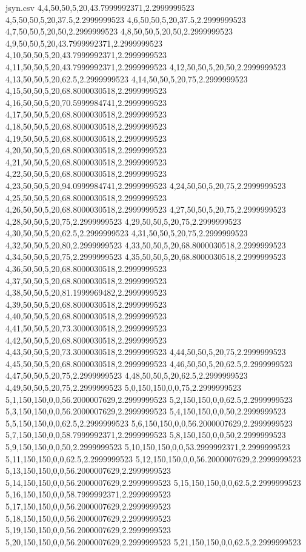 \begin{filecontents*}{jsyn.csv}
4,4,50,50,5,20,43.7999992371,2.2999999523
4,5,50,50,5,20,37.5,2.2999999523
4,6,50,50,5,20,37.5,2.2999999523
4,7,50,50,5,20,50,2.2999999523
4,8,50,50,5,20,50,2.2999999523
4,9,50,50,5,20,43.7999992371,2.2999999523
4,10,50,50,5,20,43.7999992371,2.2999999523
4,11,50,50,5,20,43.7999992371,2.2999999523
4,12,50,50,5,20,50,2.2999999523
4,13,50,50,5,20,62.5,2.2999999523
4,14,50,50,5,20,75,2.2999999523
4,15,50,50,5,20,68.8000030518,2.2999999523
4,16,50,50,5,20,70.5999984741,2.2999999523
4,17,50,50,5,20,68.8000030518,2.2999999523
4,18,50,50,5,20,68.8000030518,2.2999999523
4,19,50,50,5,20,68.8000030518,2.2999999523
4,20,50,50,5,20,68.8000030518,2.2999999523
4,21,50,50,5,20,68.8000030518,2.2999999523
4,22,50,50,5,20,68.8000030518,2.2999999523
4,23,50,50,5,20,94.0999984741,2.2999999523
4,24,50,50,5,20,75,2.2999999523
4,25,50,50,5,20,68.8000030518,2.2999999523
4,26,50,50,5,20,68.8000030518,2.2999999523
4,27,50,50,5,20,75,2.2999999523
4,28,50,50,5,20,75,2.2999999523
4,29,50,50,5,20,75,2.2999999523
4,30,50,50,5,20,62.5,2.2999999523
4,31,50,50,5,20,75,2.2999999523
4,32,50,50,5,20,80,2.2999999523
4,33,50,50,5,20,68.8000030518,2.2999999523
4,34,50,50,5,20,75,2.2999999523
4,35,50,50,5,20,68.8000030518,2.2999999523
4,36,50,50,5,20,68.8000030518,2.2999999523
4,37,50,50,5,20,68.8000030518,2.2999999523
4,38,50,50,5,20,81.1999969482,2.2999999523
4,39,50,50,5,20,68.8000030518,2.2999999523
4,40,50,50,5,20,68.8000030518,2.2999999523
4,41,50,50,5,20,73.3000030518,2.2999999523
4,42,50,50,5,20,68.8000030518,2.2999999523
4,43,50,50,5,20,73.3000030518,2.2999999523
4,44,50,50,5,20,75,2.2999999523
4,45,50,50,5,20,68.8000030518,2.2999999523
4,46,50,50,5,20,62.5,2.2999999523
4,47,50,50,5,20,75,2.2999999523
4,48,50,50,5,20,62.5,2.2999999523
4,49,50,50,5,20,75,2.2999999523
5,0,150,150,0,0,75,2.2999999523
5,1,150,150,0,0,56.2000007629,2.2999999523
5,2,150,150,0,0,62.5,2.2999999523
5,3,150,150,0,0,56.2000007629,2.2999999523
5,4,150,150,0,0,50,2.2999999523
5,5,150,150,0,0,62.5,2.2999999523
5,6,150,150,0,0,56.2000007629,2.2999999523
5,7,150,150,0,0,58.7999992371,2.2999999523
5,8,150,150,0,0,50,2.2999999523
5,9,150,150,0,0,50,2.2999999523
5,10,150,150,0,0,53.2999992371,2.2999999523
5,11,150,150,0,0,62.5,2.2999999523
5,12,150,150,0,0,56.2000007629,2.2999999523
5,13,150,150,0,0,56.2000007629,2.2999999523
5,14,150,150,0,0,56.2000007629,2.2999999523
5,15,150,150,0,0,62.5,2.2999999523
5,16,150,150,0,0,58.7999992371,2.2999999523
5,17,150,150,0,0,56.2000007629,2.2999999523
5,18,150,150,0,0,56.2000007629,2.2999999523
5,19,150,150,0,0,56.2000007629,2.2999999523
5,20,150,150,0,0,56.2000007629,2.2999999523
5,21,150,150,0,0,62.5,2.2999999523

\end{filecontents*}
